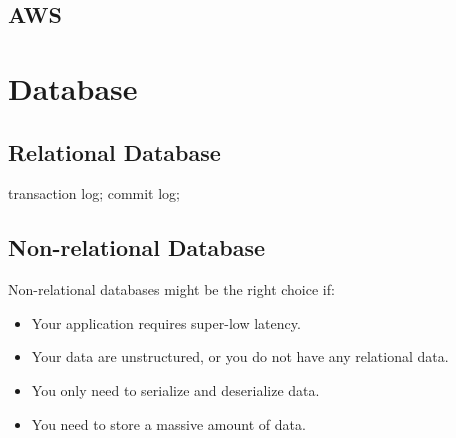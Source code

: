 \documentclass[letterpaper, oneside]{book}
\theoremstyle{definition}
\theoremstyle{remark}
\begin{document}
\chapter{AWS}


\part{Database}

\chapter{Relational Database}
transaction log; commit log;


\chapter{Non-relational Database}

Non-relational databases might be the right choice if:
\begin{itemize}
    \item Your application requires super-low latency.
    \item Your data are unstructured, or you do not have any relational data.
    \item You only need to serialize and deserialize data.
    \item You need to store a massive amount of data.
\end{itemize}
\end{document}
